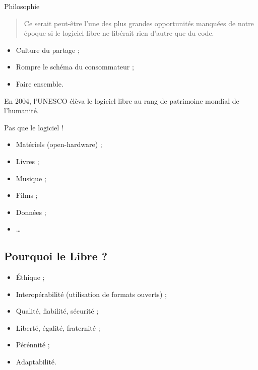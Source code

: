 \begin{frame}{Philosophie}
  \begin{flushright}
    \begin{minipage}{.85\textwidth}
      \begin{quote}\footnotesize
        \og Ce serait peut-être l'une des plus grandes opportunités manquées de notre époque si le logiciel libre ne libérait rien d'autre que du code. \fg{}
      \end{quote}
    \end{minipage}
  \end{flushright}
  
  \begin{itemize}
    \item Culture du partage ;
    \item Rompre le schéma du consommateur ;
    \item Faire ensemble.
  \end{itemize}
  
\end{frame}

\begin{frame}\centering
  En 2004, l'UNESCO élèva le logiciel libre au rang de patrimoine mondial de l'humanité.
\end{frame}

\begin{frame}{Pas que le logiciel !}
  \begin{itemize}
    \item Matériels (open-hardware) ;
    \item Livres ;
    \item Musique ;
    \item Films ;
    \item Données ;
    \item \dots
  \end{itemize}
\end{frame}

\subsection{Pourquoi le Libre ?}

\begin{frame}
  \begin{itemize}
    \item Éthique ;
    \item Interopérabilité (utilisation de formats ouverts) ;
    \item Qualité, fiabilité, sécurité ;
    \item Liberté, égalité, fraternité ;
    \item Pérénnité ;
    \item Adaptabilité.
  \end{itemize}
\end{frame}

